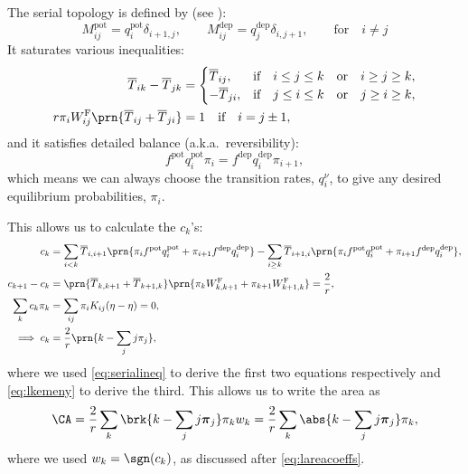 \documentclass[12pt]{article}
\newcommand{\eqm}{\pi}
\newcommand{\eq}{\boldsymbol{\eqm}}
\newcommand{\fptm}{T}
\newcommand{\fptbm}{\overline{\fptm}}
\newcommand{\wm}{w}
\newcommand{\w}{\mathbf{\wm}}
\newcommand{\Wm}{W}
\newcommand{\MMdm}{M}
\newcommand{\encm}{K}
\newcommand{\frgm}{\Wm^{\mathrm{F}}}
\newcommand{\pot}{^{\text{pot}}}
\newcommand{\dep}{^{\text{dep}}}
\begin{document}
The serial topology is defined by (see \cite{Leibold2008serial,Ben-DayanRubin2007sparse}):
%
\begin{equation}\label{eq:serialdef}
  \MMdm\pot_{ij} = q\pot_i \delta_{i+1,j},
  \qquad
  \MMdm\dep_{ij} = q\dep_j \delta_{i,j+1},
  \qquad \text{for}\quad i \neq j
\end{equation}
%
It saturates various inequalities:
%
\begin{equation}\label{eq:serialineq}
  \begin{aligned}
    \fptbm_{ik} - \fptbm_{jk} &=
      \begin{cases}
        \fptbm_{ij},  &\text{if}\quad i \leq j \leq k \quad\text{or}\quad i \geq j \geq k,\\
        -\fptbm_{ji}, &\text{if}\quad j \leq i \leq k \quad\text{or}\quad j \geq i \geq k,\\
      \end{cases} \\
    r\eqm_i \frgm_{ij} \prn{\fptbm_{ij}+\fptbm_{ji}} &= 1 \quad\text{if}\quad i=j\pm1,
  \end{aligned}
\end{equation}
%
and it satisfies detailed balance (a.k.a.\ reversibility):
%
\begin{equation}\label{eq:multistateprob}
  f\pot q\pot_i \eqm_i = f\dep q\dep_i \eqm_{i+1},
\end{equation}
%
which means we can always choose the transition rates, $q^\nu_i$, to give any desired equilibrium probabilities, $\eqm_i$.

This allows us to calculate the $c_k$'s:
%
\begin{equation}\label{eq:serialareacoeff}
\begin{aligned}
  c_k &= \sum_{i<k} \fptbm_{i,i+1} \prn{\eqm_{i} f\pot q\pot_i + \eqm_{i+1} f\dep q\dep_i}
    - \sum_{i\geq k} \fptbm_{i+1,i} \prn{\eqm_{i} f\pot q\pot_i + \eqm_{i+1} f\dep q\dep_i}
  ,\\
  c_{k+1} - c_k &= \prn{\fptbm_{k,k+1} + \fptbm_{k+1,k}} \prn{\eqm_{k} \frgm_{k,k+1} + \eqm_{k+1} \frgm_{k+1,k}}
    =%
    \frac{2}{r},\\
  \sum_k c_k \eqm_k &= \sum_{ij} \eqm_i \encm_{ij} (\eta-\eta) = 0,\\
  \implies c_k &= \frac{2}{r} \prn{k - \sum_j j\eqm_j},
\end{aligned}
\end{equation}
%
where we used \cref{eq:serialineq} to derive the first two equations respectively and \cref{eq:lkemeny} to derive the third. 
This allows us to write the area as
%
\begin{equation}\label{eq:serialarea}
  \CA = \frac{2}{r} \sum_k \brk{k - \sum_j j\eq_j} \eqm_k \wm_k
    = \frac{2}{r} \sum_k \abs{k - \sum_j j\eq_j} \eqm_k ,
\end{equation}
%
where we used $\wm_k=\sgn(c_k)$, as discussed after \cref{eq:lareacoeffs}.
\end{document}
